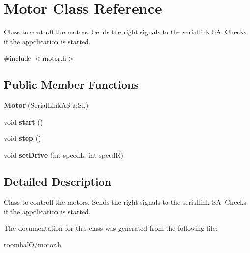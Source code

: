 \hypertarget{class_motor}{}\section{Motor Class Reference}
\label{class_motor}


Class to controll the motors. Sends the right signals to the seriallink SA. Checks if the appclication is started.  




{\ttfamily \#include $<$motor.\+h$>$}

\subsection*{Public Member Functions}
\begin{DoxyCompactItemize}
\item 
\mbox{\label{class_motor_ab88d2179d7683c17c321e6e175461302}} 
{\bfseries Motor} (Serial\+Link\+AS \&SL)
\item 
\mbox{\label{class_motor_a4611645742488ec6e915e555b6468a27}} 
void {\bfseries start} ()
\item 
\mbox{\label{class_motor_a015fd5308d4d27e5dcf7f9ea3d5c03f6}} 
void {\bfseries stop} ()
\item 
\mbox{\label{class_motor_ade0b803de873e02a479b27f2c6e97b92}} 
void {\bfseries set\+Drive} (int speedL, int speedR)
\end{DoxyCompactItemize}


\subsection{Detailed Description}
Class to controll the motors. Sends the right signals to the seriallink SA. Checks if the appclication is started. 

The documentation for this class was generated from the following file\+:\begin{DoxyCompactItemize}
\item 
roomba\+I\+O/motor.\+h\end{DoxyCompactItemize}
